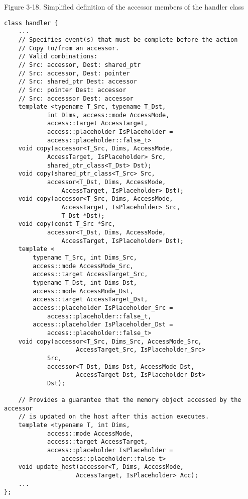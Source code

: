 \hspace*{\fill} \par %
Figure 3-18. Simplified definition of the accessor members of the handler class
\begin{lstlisting}[caption={}]
class handler {
	...
	// Specifies event(s) that must be complete before the action
	// Copy to/from an accessor.
	// Valid combinations:
	// Src: accessor, Dest: shared_ptr
	// Src: accessor, Dest: pointer
	// Src: shared_ptr Dest: accessor
	// Src: pointer Dest: accessor
	// Src: accesssor Dest: accessor
	template <typename T_Src, typename T_Dst, 
			int Dims, access::mode AccessMode,
			access::target AccessTarget,
			access::placeholder IsPlaceholder = 
			access::placeholder::false_t>
	void copy(accessor<T_Src, Dims, AccessMode, 
			AccessTarget, IsPlaceholder> Src,
			shared_ptr_class<T_Dst> Dst);
	void copy(shared_ptr_class<T_Src> Src,
			accessor<T_Dst, Dims, AccessMode, 
				AccessTarget, IsPlaceholder> Dst);
	void copy(accessor<T_Src, Dims, AccessMode, 
				AccessTarget, IsPlaceholder> Src,
				T_Dst *Dst);
	void copy(const T_Src *Src,
			accessor<T_Dst, Dims, AccessMode, 
				AccessTarget, IsPlaceholder> Dst);
	template <
		typename T_Src, int Dims_Src, 
		access::mode AccessMode_Src,
		access::target AccessTarget_Src, 
		typename T_Dst, int Dims_Dst,
		access::mode AccessMode_Dst, 
		access::target AccessTarget_Dst,
		access::placeholder IsPlaceholder_Src = 
			access::placeholder::false_t,
		access::placeholder IsPlaceholder_Dst = 
			access::placeholder::false_t>
	void copy(accessor<T_Src, Dims_Src, AccessMode_Src, 
					AccessTarget_Src, IsPlaceholder_Src>
			Src,
			accessor<T_Dst, Dims_Dst, AccessMode_Dst, 
					AccessTarget_Dst, IsPlaceholder_Dst>
			Dst);
			
	// Provides a guarantee that the memory object accessed by the accessor
	// is updated on the host after this action executes.
	template <typename T, int Dims, 
			access::mode AccessMode,
			access::target AccessTarget,
			access::placeholder IsPlaceholder =
				access::placeholder::false_t>
	void update_host(accessor<T, Dims, AccessMode, 
					AccessTarget, IsPlaceholder> Acc);
	...
};
\end{lstlisting}













